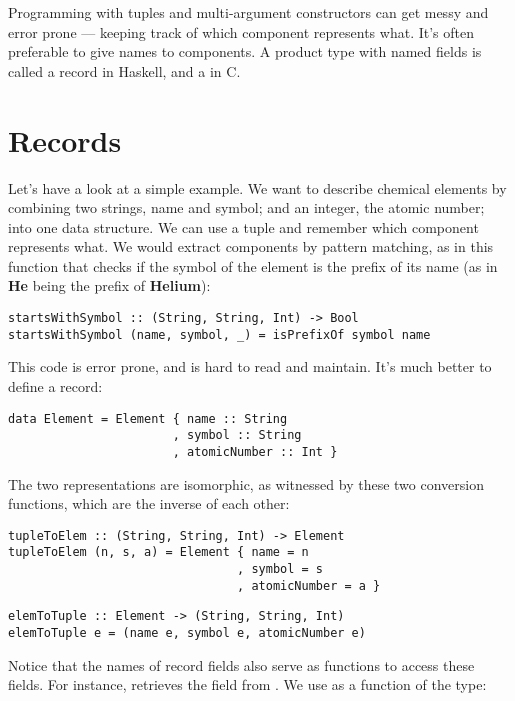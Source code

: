 Programming with tuples and multi-argument constructors can get messy
and error prone --- keeping track of which component represents what.
It's often preferable to give names to components. A product type with
named fields is called a record in Haskell, and a  in C.

\section{Records}

Let's have a look at a simple example. We want to describe chemical
elements by combining two strings, name and symbol; and an integer, the
atomic number; into one data structure. We can use a tuple
 and remember which component represents
what. We would extract components by pattern matching, as in this
function that checks if the symbol of the element is the prefix of its
name (as in \textbf{He} being the prefix of \textbf{Helium}):

\begin{Verbatim}
startsWithSymbol :: (String, String, Int) -> Bool
startsWithSymbol (name, symbol, _) = isPrefixOf symbol name
\end{Verbatim}
This code is error prone, and is hard to read and maintain. It's much
better to define a record:

\begin{Verbatim}
data Element = Element { name :: String 
                       , symbol :: String 
                       , atomicNumber :: Int }
\end{Verbatim}
The two representations are isomorphic, as witnessed by these two
conversion functions, which are the inverse of each other:

\begin{Verbatim}
tupleToElem :: (String, String, Int) -> Element
tupleToElem (n, s, a) = Element { name = n 
                                , symbol = s 
                                , atomicNumber = a }
\end{Verbatim}

\begin{Verbatim}
elemToTuple :: Element -> (String, String, Int)
elemToTuple e = (name e, symbol e, atomicNumber e)
\end{Verbatim}
Notice that the names of record fields also serve as functions to access
these fields. For instance,  retrieves the
 field from . We use
 as a function of the type:

